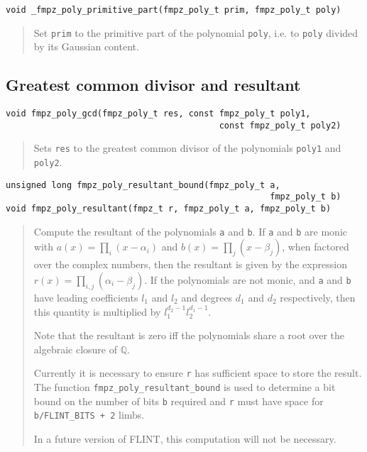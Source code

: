 \documentclass[a4paper,10pt]{article}
\newcommand{\Q}{\mathbb{Q}}
\newcommand{\code}{\lstinline}
\begin{document}
\begin{lstlisting}
void _fmpz_poly_primitive_part(fmpz_poly_t prim, fmpz_poly_t poly)
\end{lstlisting}
\begin{quote}
Set \code{prim} to the primitive part of the polynomial \code{poly}, i.e. to \code{poly} divided by its Gaussian content.
\end{quote}

\subsection{Greatest common divisor and resultant}
\begin{lstlisting}
void fmpz_poly_gcd(fmpz_poly_t res, const fmpz_poly_t poly1, 
                                          const fmpz_poly_t poly2)
\end{lstlisting}
\begin{quote}
Sets \code{res} to the greatest common divisor of the polynomials \code{poly1} and \code{poly2}.
\end{quote}

\begin{lstlisting}
unsigned long fmpz_poly_resultant_bound(fmpz_poly_t a, 
                                                    fmpz_poly_t b)
void fmpz_poly_resultant(fmpz_t r, fmpz_poly_t a, fmpz_poly_t b)
\end{lstlisting}
\begin{quote}
Compute the resultant of the polynomials \code{a} and \code{b}. If \code{a} and \code{b} are monic with $a(x) = \prod_i (x - \alpha_i)$ and $b(x) = \prod_j (x - \beta_j)$, when factored over the complex numbers, then the resultant is given by the expression $r(x) = \prod_{i,j} (\alpha_i - \beta_j)$. If the polynomials are not monic, and \code{a} and \code{b} have leading coefficients $l_1$ and $l_2$ and degrees $d_1$ and $d_2$ respectively, then this quantity is multiplied by $l_1^{d_2-1}l_2^{d_1-1}$.

Note that the resultant is zero iff the polynomials share a root over the algebraic closure of $\Q$.

Currently it is necessary to ensure \code{r} has sufficient space to store the result. The function \code{fmpz_poly_resultant_bound} is used to determine a bit bound on the number of bits \code{b} required and \code{r} must have space for \code{b/FLINT_BITS + 2} limbs.

In a future version of FLINT, this computation will not be necessary.
\end{quote}
\end{document}
